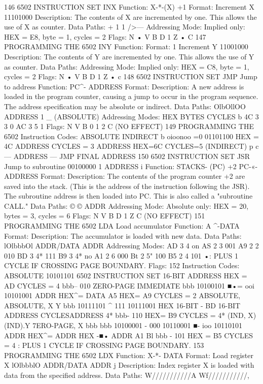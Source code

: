 146
6502 INSTRUCTION SET
INX
Function:
X-*-(X) +1
Format:
Increment X
11101000
Description:
The contents of X are incremented by one. This allows the use
of X as counter.
Data Paths:
+ 1
1
/>—
Addressing Mode:
Implied only:
HEX = E8, byte = 1, cycles = 2
Flags:
N
•
V B D 1 Z
•
C
147
PROGRAMMING THE 6502
INY
Function:
Format:
1
Increment Y
11001000
Description:
The contents of Y are incremented by one. This allows the use
of Y as counter.
Data Paths:
Addressing Mode:
Implied only:
HEX = C8, byte = 1, cycles = 2
Flags:
N
•
V B D 1 Z
•
c
148
6502 INSTRUCTION SET
JMP Jump to address
Function:
PC^- ADDRESS
Format:
Description:
A new address is loaded in the program counter, causing a jump
to occur in the program sequence. The address specification may
be absolute or indirect.
Data Paths:
OlbOllOO ADDRESS
1 _
(ABSOLUTE)
Addressing Modes:
HEX
BYTES
CYCLES
b
4C
3
3
0
AC
3
5
1
Flags:
N V B 0 1 2 C
(NO EFFECT)
149
PROGRAMMING THE 6502
Instruction Codes:
ABSOLUTE
INDIRECT
b
oioonoo
=0
01101100
HEX = 4C
ADDRESS
CYCLES = 3
ADDRESS
HEX=6C CYCLES=5
(INDIRECT)
p c
— ADDRESS —
JMP
FINAL ADDRESS
150
6502 INSTRUCTION SET
JSR Jump to subroutine
00100000
1
ADDRESS
i
Function:
STACKS- (PC) +2
PC-«- ADDRESS
Format:
Description:
The contents of the program counter +2 are saved into the
stack. (This is the address of the instruction following the JSR).
The subroutine address is then loaded into PC. This is also called
a "subroutine CALL."
Data Paths:
©
©
ADDR
Addressing Mode:
Absolute only:
HEX = 20, bytes = 3, cycles = 6
Flags:
N V B D 1 Z C
(NO EFFECT)
151
PROGRAMMING THE 6502
LDA Load accumulator
Function:
A ^-DATA
Format:
Description:
The accumulator is loaded with new data.
Data Paths:
lOlbbbOl ADDR/DATA ADDR
Addressing Modes:
AD
3
4
on
AS
2
3
001
A9
2
2
010
BD
3
4*
111
B9
3
4*
no
A1
2
6
000
Bt
2
5"
100
B5
2
4
101
•: PLUS 1 CYCLE IF CROSSING PAGE BOUNDARY.
Flags:
152
Instruction Codes:
ABSOLUTE 10101101
6502 INSTRUCTION SET
16-BIT ADDRESS
HEX = AD CYCLES = 4
bbb-- 010
ZERO-PAGE
IMMEDIATE
bbb
10100101
■•= ooi
10101001
ADDR
HEX^=
DATA
A5
HEX= A9 CYCLES = 2
ABSOLUTE,
ABSOLUTE,
X
Y
bbb
10111101
^ 111
10111001
HEX
16-BIT
- BD
16-BIT
ADDRESS
CYCLESADDRESS
4*
bbb- 110 HEX= B9 CYCLES = 4*
(IND, X)
(IND).Y
7ERO-PAGE, X
bbb
bbb
10100001
- 000
10110001
■- ioo
10110101
ADDR
HEX^=
ADDR
HEX -■•
ADDR
A1
Bl
bbb - 101 HEX = B5 CYCLES = 4
: PLUS 1 CYCLE IF CROSSING PAGE BOUNDARY.
153
PROGRAMMING THE 6502
LDX
Function:
X-*- DATA
Format:
Load register X
lOlbbblO ADDR/DATA ADDR j
Description:
Index register X is loaded with data from the specified address.
Data Paths:
W///////////A Wf///////////,
